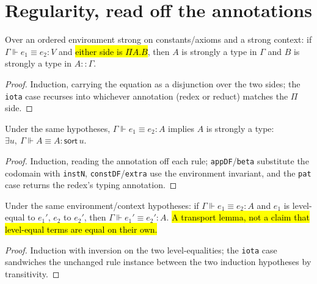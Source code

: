 \section{Regularity, read off the annotations}

\begin{theorem}
\label{thm:strong-foralle-inv}
\leanok
{}

 Over an ordered environment strong on constants/axioms and a strong context: if
$\Gamma\Vdash e_1\equiv e_2:V$ and \hl{either side is $\Pi A.B$}, then $A$ is strongly a type in
$\Gamma$ and $B$ is strongly a type in $A::\Gamma$.
\end{theorem}
\begin{proof}
\leanok
{} Induction, carrying the equation as a disjunction over the two sides; the
\texttt{iota} case recurses into whichever annotation (redex or reduct) matches the $\Pi$ side.
\end{proof}

\begin{theorem}
\label{thm:strong-istype}
\leanok
{}

 Under the same hypotheses, $\Gamma\Vdash e_1\equiv e_2:A$ implies $A$ is
strongly a type: $\exists u,\ \Gamma\Vdash A\equiv A:\mathsf{sort}\,u$.
\end{theorem}
\begin{proof}
\leanok
{} Induction, reading the annotation off each rule; \texttt{appDF}/\texttt{beta}
substitute the codomain with \texttt{instN}, \texttt{constDF}/\texttt{extra} use the
environment invariant, and the \texttt{pat} case returns the redex's typing annotation.
\end{proof}

\begin{lemma}
\label{thm:equptolevels-defeq}
\leanok
{}

 Under the same environment/context hypotheses: if $\Gamma\Vdash e_1\equiv e_2:A$
and $e_1$ is level-equal to $e_1'$, $e_2$ to $e_2'$, then $\Gamma\Vdash e_1'\equiv e_2':A$.
\hl{A transport lemma, not a claim that level-equal terms are equal on their own.}
\end{lemma}
\begin{proof}
\leanok
{} Induction with inversion on the two level-equalities; the \texttt{iota} case
sandwiches the unchanged rule instance between the two induction hypotheses by transitivity.
\end{proof}

